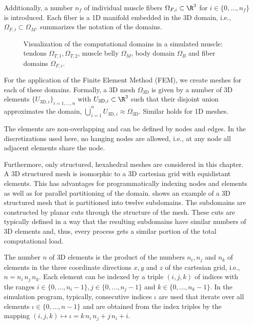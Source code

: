 Additionally, a number $n_f$ of individual muscle fibers $\Omega_{F,i} \subset \R^3$ for $i \in \{0,\dots,n_f\}$ is introduced. Each fiber is a 1D manifold embedded in the 3D domain, i.e., $\Omega_{F,i} \subset \Omega_M$.  summarizes the notation of the domains.

\begin{figure}%
    \centering%
    \def\svgwidth{8cm}%
    \caption{Visualization of the computational domains in a simulated muscle: tendons $\Omega_{T,1}, \Omega_{T,2}$, muscle belly $\Omega_M$, body domain $\Omega_B$ and fiber domains $\Omega_{F,i}$.}%
    \label{fig:fibers_domains}%
\end{figure}%

For the application of the Finite Element Method (FEM), we create meshes for each of these domains. Formally, a 3D mesh $\Omega_\text{3D}$ is given by a number of 3D elements $\{U_{\text{3D},i}\}_{i=1,\dots,n}$ with $U_{\text{3D},i} \subset \R^3$ such that their disjoint union approximates the domain,
$\dot{\bigcup}_{i=1}^{n} U_{\text{3D},i} \approx \Omega_\text{3D}$. Similar holds for 1D meshes.

The elements are non-overlapping and can be defined by nodes and edges. In the discretizations used here, no hanging nodes are allowed, i.e., at any node all adjacent elements share the node.

Furthermore, only structured, hexahedral meshes are considered in this chapter.
A 3D structured mesh is isomorphic to a 3D cartesian grid with equidistant elements. 
This has advantages for programmatically indexing nodes and elements as well as for parallel partitioning of the domain.
 shows an example of a 3D structured mesh that is partitioned into twelve subdomains. The subdomains are constructed by planar cuts through the structure of the mesh. These cuts are typically defined in a way that the resulting subdomains have similar numbers of 3D elements and, thus, every process gets a similar portion of the total computational load.

The number $n$ of 3D elements is the product of the numbers $n_i, n_j$ and $n_k$ of elements in the three coordinate directions $x,y$ and $z$ of the cartesian grid,
 i.e., $n = n_i\,n_j\, n_k$.
Each element can be indexed by a triple $(i,j,k)$ of indices with the ranges $i \in \{0,\dots,n_i-1\}, j \in \{0,\dots, n_j-1\}$ and $k \in \{0,\dots,n_k-1\}$. 
In the simulation program, typically, consecutive indices $\iota$ are used that iterate over all elements $\iota \in \{0,\dots,n-1\}$ and are obtained from the index triples by the mapping 
$(i,j,k) \mapsto \iota = k\,n_i\,n_j + j\,n_i + i$.

